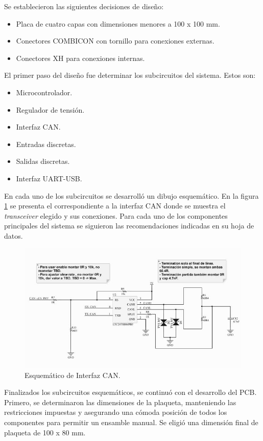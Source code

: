 Se establecieron las siguientes decisiones de diseño:
\begin{itemize}
	\item Placa de cuatro capas con dimensiones menores a 100 x 100 mm.
	\item Conectores COMBICON con tornillo \citep{web_combicon} para conexiones externas.
	\item Conectores XH \citep{web_xh_connector} para conexiones internas. 
\end{itemize} 

El primer paso del diseño fue determinar los subcircuitos del sistema. Estos son:
\begin{itemize}
	\item Microcontrolador.
	\item Regulador de tensión.
	\item Interfaz CAN.
	\item Entradas discretas.
	\item Salidas discretas.
	\item Interfaz UART-USB.
\end{itemize}

En cada uno de los subcircuitos se desarrolló un dibujo esquemático. En la figura \ref{fig:esquematico_can} se presenta el correspondiente a la interfaz CAN donde se muestra el \textit{transceiver} elegido y sus conexiones. Para cada uno de los componentes principales del sistema se siguieron las recomendaciones indicadas en su hoja de datos. 

\begin{figure}[htbp]
	\centering
	\includegraphics[scale=.7]{./Figures/sch_can.JPG}
	\caption{Esquemático de Interfaz CAN.}
	\label{fig:esquematico_can}
\end{figure}

Finalizados los subcircuitos esquemáticos, se continuó con el desarrollo del PCB. Primero, se determinaron las dimensiones de la plaqueta, manteniendo las restricciones impuestas y asegurando una cómoda posición de todos los componentes para permitir un ensamble manual. Se eligió una dimensión final de plaqueta de 100 x 80 mm. 

